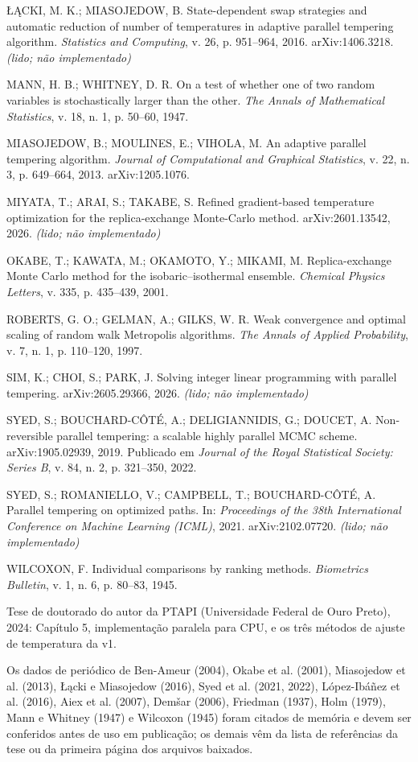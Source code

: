 \documentclass[10pt,a4paper]{article}
\newenvironment{referencias}{\small\newcommand{\refitem}{\par\hangindent=7mm\hangafter=1 }}{\par}
\begin{document}
\begin{referencias}
 ŁĄCKI, M. K.; MIASOJEDOW, B. State-dependent swap strategies and automatic reduction of number of temperatures in adaptive parallel tempering algorithm. \textit{Statistics and Computing}, v. 26, p. 951–964, 2016. arXiv:1406.3218. \textit{(lido; não implementado)}

 MANN, H. B.; WHITNEY, D. R. On a test of whether one of two random variables is stochastically larger than the other. \textit{The Annals of Mathematical Statistics}, v. 18, n. 1, p. 50–60, 1947.

 MIASOJEDOW, B.; MOULINES, E.; VIHOLA, M. An adaptive parallel tempering algorithm. \textit{Journal of Computational and Graphical Statistics}, v. 22, n. 3, p. 649–664, 2013. arXiv:1205.1076.

 MIYATA, T.; ARAI, S.; TAKABE, S. Refined gradient-based temperature optimization for the replica-exchange Monte-Carlo method. arXiv:2601.13542, 2026. \textit{(lido; não implementado)}

 OKABE, T.; KAWATA, M.; OKAMOTO, Y.; MIKAMI, M. Replica-exchange Monte Carlo method for the isobaric–isothermal ensemble. \textit{Chemical Physics Letters}, v. 335, p. 435–439, 2001.

 ROBERTS, G. O.; GELMAN, A.; GILKS, W. R. Weak convergence and optimal scaling of random walk Metropolis algorithms. \textit{The Annals of Applied Probability}, v. 7, n. 1, p. 110–120, 1997.

 SIM, K.; CHOI, S.; PARK, J. Solving integer linear programming with parallel tempering. arXiv:2605.29366, 2026. \textit{(lido; não implementado)}

 SYED, S.; BOUCHARD-CÔTÉ, A.; DELIGIANNIDIS, G.; DOUCET, A. Non-reversible parallel tempering: a scalable highly parallel MCMC scheme. arXiv:1905.02939, 2019. Publicado em \textit{Journal of the Royal Statistical Society: Series B}, v. 84, n. 2, p. 321–350, 2022.

 SYED, S.; ROMANIELLO, V.; CAMPBELL, T.; BOUCHARD-CÔTÉ, A. Parallel tempering on optimized paths. In: \textit{Proceedings of the 38th International Conference on Machine Learning (ICML)}, 2021. arXiv:2102.07720. \textit{(lido; não implementado)}

 WILCOXON, F. Individual comparisons by ranking methods. \textit{Biometrics Bulletin}, v. 1, n. 6, p. 80–83, 1945.

 Tese de doutorado do autor da PTAPI (Universidade Federal de Ouro Preto), 2024: Capítulo 5, implementação paralela para CPU, e os três métodos de ajuste de temperatura da v1.
 \end{referencias}

{\small Os dados de periódico de Ben-Ameur (2004), Okabe et al. (2001), Miasojedow et al. (2013), Łącki e Miasojedow (2016), Syed et al. (2021, 2022), López-Ibáñez et al. (2016), Aiex et al. (2007), Demšar (2006), Friedman (1937), Holm (1979), Mann e Whitney (1947) e Wilcoxon (1945) foram citados de memória e devem ser conferidos antes de uso em publicação; os demais vêm da lista de referências da tese ou da primeira página dos arquivos baixados.\par}
\end{document}
